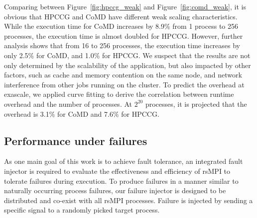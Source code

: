 Comparing between Figure~\ref{fig:hpccg_weak} and Figure~\ref{fig:comd_weak}, it is obvious that HPCCG and CoMD have different weak scaling characteristics. While the execution time for CoMD increases by 8.9\% from 1 process to 256 processes, the execution time is almost doubled for HPCCG. However, further analysis shows that from 16 to 256 processes, the execution time increases by only 2.5\% for CoMD, and 1.0\% for HPCCG. We suspect that the results are not only determined by the scalability of the application, but also impacted by other factors, such as cache and memory contention on the same node, and network interference from other jobs running on the cluster. %
To predict the overhead at exascale, we applied curve fitting to derive the correlation between runtime overhead and the number of processes. At $2^{20}$ processes, it is projected that the overhead is 3.1\% for CoMD and 7.6\% for HPCCG. 



\subsection{Performance under failures}

As one main goal of this work is to achieve fault tolerance, an integrated fault injector is required to evaluate the effectiveness and efficiency of rsMPI to tolerate failures during execution. To produce failures in a manner similar to naturally occurring process failures, our failure injector is designed to be distributed and co-exist with all rsMPI processes. Failure is injected by sending a specific signal to a randomly picked target process.

